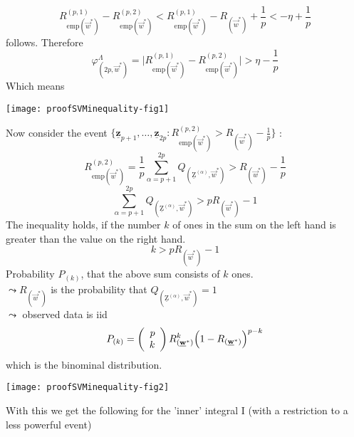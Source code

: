 \begin{equation}
	R_{ \mathrm{emp}( \vec{w}^* ) }^{ (p, 1) } 
	- R_{ \mathrm{emp}( \vec{w}^* ) }^{ (p, 2) }
	< R_{ \mathrm{emp}( \vec{w}^* ) }^{ (p, 1) }
	- R_{ ( \vec{w}^* ) } + \frac{1}{p} 
	< -\eta + \frac{1}{p}
\end{equation}
follows. Therefore
\begin{equation}
	\varphi_{ (2p, \vec{w}^* ) }^\Lambda = 
	\Big| R_{ \mathrm{emp}( \vec{w}^* ) }^{ (p, 1) } 
	- R_{ \mathrm{emp}( \vec{w}^* ) }^{ (p, 2) } \Big|
	> \eta - \frac{1}{p}
\end{equation}
Which means
\begin{center}
	\texttt{[image: proofSVMinequality-fig1]}
\end{center}
Now consider the event $\Big\{ \mathbf{ \underline{z}}_{p+1}, \ldots, \mathbf{ \underline{z}}_{2p} : R_{ \mathrm{emp}( \vec{w}^* ) }^{ (p, 2) } > R_{ ( \vec{w}^* ) } - \frac{1}{p} \Big\}$ :
\begin{equation}
	R_{ \mathrm{emp}( \vec{w}^* ) }^{ (p, 2) }
	= \frac{1}{p} \sum_{ \alpha = p + 1 }^{2p} 
		Q_{ ( \mathrm{ \underline{Z} }^{ (\alpha ) }, 
		\vec{w}^* ) }
	> R_{ ( \vec{w}^* ) } - \frac{1}{p}
\end{equation}
\begin{equation}
	\sum_{ \alpha = p + 1 }^{2p} 
		Q_{ ( \mathrm{ \underline{Z} }^{ (\alpha ) }, 
		\vec{w}^* ) }
	> pR_{ ( \vec{w}^* ) } - 1
\end{equation}
The inequality holds, if the number $k$ of ones in the sum on the left hand is greater than the value on the right hand.
\begin{equation}
	k > pR_{ ( \vec{w}^* ) } - 1
\end{equation}
Probability $P_{(k)}$, that the above sum consists of $k$ ones.\\
$\leadsto R_{ ( \vec{w}^* ) }$ is the probability that $Q_{ ( \mathrm{ \underline{Z} }^{ (\alpha ) },	\vec{w}^* ) } = 1$\\
$\leadsto$ observed data is iid
\begin{equation}
	P_{ (k) } = \left( \begin{array}{rrrrrrrrrrrrrrrrrrrrrrrrrr} p\\k\\ \end{array} \right) R_{ ( \underline{\mathbf{w}}^* ) }^k 
		\Big( 1 - R_{ ( \underline{\mathbf{w}}^* ) } \Big)^{p-k}
\end{equation}
which is the binominal distribution.
\begin{center}
	\texttt{[image: proofSVMinequality-fig2]}
\end{center}
With this we get the following for the 'inner' integral I (with a restriction to a less powerful event)
